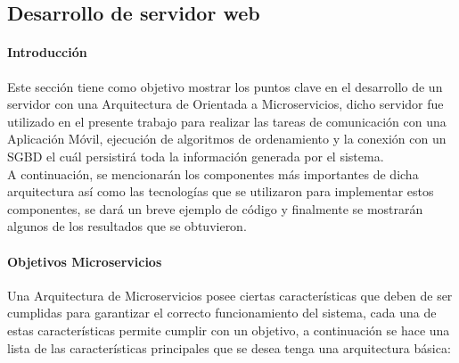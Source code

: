 \subsection{Desarrollo de servidor web}

\paragraph{Introducción}
Este sección tiene como objetivo mostrar los puntos clave en el desarrollo de un servidor con una Arquitectura de Orientada a Microservicios, dicho servidor fue utilizado en el presente trabajo para realizar las tareas de comunicación con una Aplicación Móvil, ejecución de algoritmos de ordenamiento y la conexión con un SGBD el cuál persistirá toda la información generada por el sistema. \\

A continuación, se mencionarán los componentes más importantes de dicha arquitectura así como las tecnologías que se utilizaron para implementar estos componentes, se dará un breve ejemplo de código y finalmente se mostrarán algunos de los resultados que se obtuvieron. \\

\paragraph{Objetivos Microservicios}
Una Arquitectura de Microservicios posee ciertas características que deben de ser cumplidas para garantizar el correcto funcionamiento del sistema, cada una de estas características permite cumplir con un objetivo, a continuación se hace una lista de las características principales que se desea tenga una arquitectura básica:

